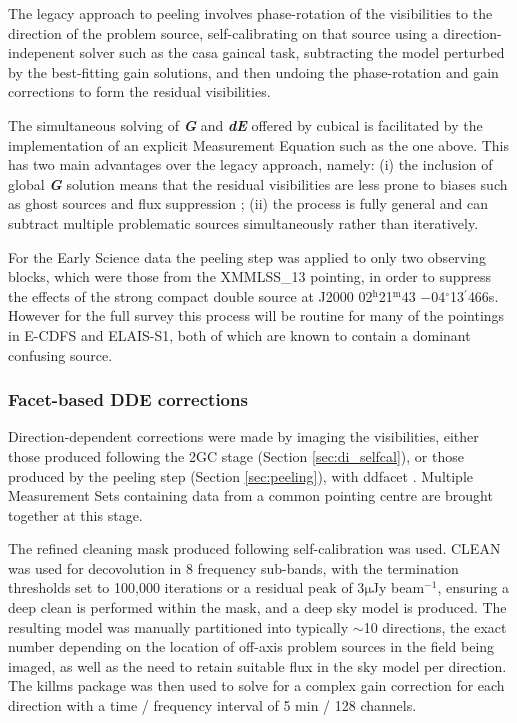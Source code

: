 \documentclass[usenatbib,usedcolumn]{mnras}
\newcommand{\hhh}{$^{\mathrm{h}}$}
\newcommand{\mmm}{$^{\mathrm{m}}$}
\newcommand{\ddd}{$^{\mathrm{\circ}}$}
\newcommand{\dmm}{$^{\prime}$}
\begin{document}
The legacy approach to peeling involves phase-rotation of the visibilities to the direction of the problem source, self-calibrating on that source using a direction-indepenent solver such as the {\sc casa gaincal} task, subtracting the model perturbed by the best-fitting gain solutions, and then undoing the phase-rotation and gain corrections to form the residual visibilities. 

The simultaneous solving of \textit{\textbf{G}} and \textit{\textbf{dE}} offered by {\sc cubical} \citep[and first introduced by {\sc meqtrees};][]{noordam2010} is facilitated by the implementation of an explicit Measurement Equation such as the one above. This has two main advantages over the legacy approach, namely: (i) the inclusion of global \textit{\textbf{G}} solution means that the residual visibilities are less prone to biases such as ghost sources \cite[e.g.][]{grobler2014} and flux suppression  \citep[e.g][]{sardarabadi2019}; (ii) the process is fully general and can subtract multiple problematic sources simultaneously rather than iteratively.

For the Early Science data the peeling step was applied to only two observing blocks, which were those from the XMMLSS\_13 pointing, in order to suppress the effects of the strong compact double source at J2000 02\hhh21\mmm43 $-$04\ddd13\dmm46\farcs6s. However for the full survey this process will be routine for many of the pointings in E-CDFS and ELAIS-S1, both of which are known to contain a dominant confusing source.

\subsubsection{Facet-based DDE corrections}
\label{sec:ddfacet}

Direction-dependent corrections were made by imaging the visibilities, either those produced following the 2GC stage (Section \ref{sec:di_selfcal}), or those produced by the peeling step (Section \ref{sec:peeling}), with {\sc ddfacet} \citep{tasse2018}. Multiple Measurement Sets containing data from a common pointing centre are brought together at this stage.

The refined cleaning mask produced following self-calibration was used. \citet{hogbom1974} CLEAN was used for decovolution in 8 frequency sub-bands, with the termination thresholds set to 100,000 iterations or a residual peak of 3$\mathrm{\mu}$Jy beam$^{-1}$, ensuring a deep clean is performed within the mask, and a deep sky model is produced. The resulting model was manually partitioned into typically $\sim$10 directions, the exact number depending on the location of off-axis problem sources in the field being imaged, as well as the need to retain suitable flux in the sky model per direction. The {\sc killms} package \citep[e.g][]{smirnov2015} was then used to solve for a complex gain correction for each direction with a time / frequency interval of 5 min / 128 channels. 
\end{document}
